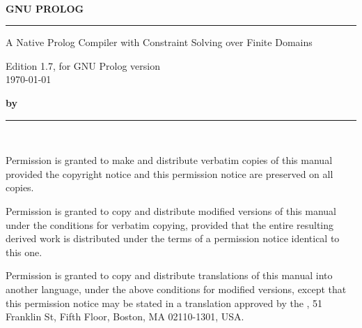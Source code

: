 \pagestyle{empty}
\setlength{\parskip}{0pt}
~

\vspace{4cm}
{\huge\bf GNU PROLOG}
\vspace{3mm}

\rule[2mm]{\linewidth}{2mm}

\begin{flushright}
{\Large
A Native Prolog Compiler with Constraint Solving over Finite Domains

Edition 1.7, for GNU Prolog version \\

\today
}
\end{flushright}

\vspace{13cm}

{\Large\bf by }

\rule[2mm]{\linewidth}{1mm}

\newpage
~

\vspace{17cm}

\setlength{\parskip}{\saveparskip}



Permission is granted to make and distribute verbatim copies of this manual
provided the copyright notice and this permission notice are preserved on all
copies.

Permission is granted to copy and distribute modified versions of this manual
under the conditions for verbatim copying, provided that the entire resulting
derived work is distributed under the terms of a permission notice identical
to this one.

Permission is granted to copy and distribute translations of this manual into
another language, under the above conditions for modified versions, except
that this permission notice may be stated in a translation approved by the
, 51 Franklin St, Fifth Floor, Boston, MA  02110-1301, USA.


\newpage
\pagestyle{fancy}
\setcounter{page}{1}


